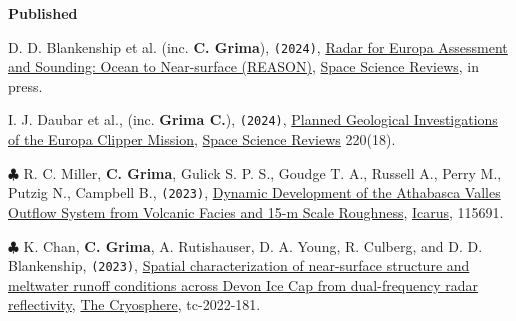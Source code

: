\textbf{Published}
\begin{etaremune}
\def\labelenumi{\arabic{enumi}.}

\item
  D. D. Blankenship et al. (inc. \textbf{C. Grima}), \texttt{(2024)}, \href{}{Radar for Europa Assessment and Sounding: Ocean to Near-surface (REASON)}, \ul{Space Science Reviews}, in press.
  
\item
  I. J. Daubar et al., (inc. \textbf{Grima C.}), \texttt{(2024)}, \href{https://link.springer.com/article/10.1007/s11214-023-01036-z?utm_source=rct_congratemailt&utm_medium=email&utm_campaign=oa_20240212&utm_content=10.1007/s11214-023-01036-z}{Planned Geological Investigations of the Europa Clipper Mission}, \ul{Space Science Reviews} 220(18).

\item
  $\clubsuit$ R. C. Miller, \textbf{C. Grima}, Gulick S. P. S., Goudge T. A., Russell A., Perry M., Putzig N., Campbell B., \texttt{(2023)}, \href{https://www.sciencedirect.com/science/article/pii/S0019103523002683}{Dynamic Development of the Athabasca Valles Outflow System from Volcanic Facies and 15-m Scale Roughness}, \ul{Icarus}, 115691.   

\item
  $\clubsuit$ K. Chan, \textbf{C. Grima}, A. Rutishauser, D. A. Young, R. Culberg, and D. D. Blankenship, \texttt{(2023)}, \href{https://tc.copernicus.org/preprints/tc-2022-181/}{Spatial characterization of near-surface structure and meltwater runoff conditions across Devon Ice Cap from dual-frequency radar reflectivity}, \ul{The Cryosphere}, tc-2022-181.


\end{etaremune}

